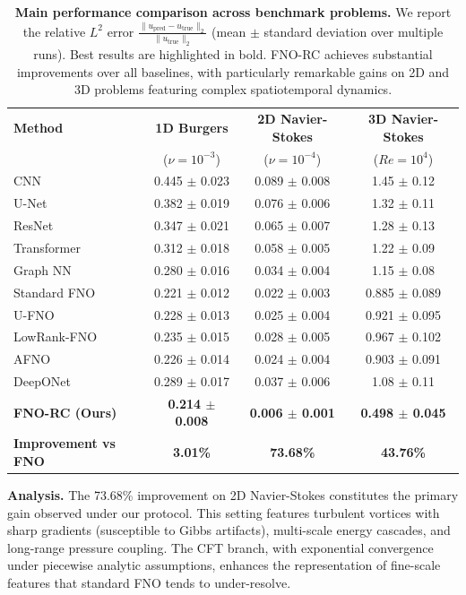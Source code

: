\documentclass[11pt]{article}
\begin{document}
\begin{table}[h]
\centering
\caption{\textbf{Main performance comparison across benchmark problems.} We report the relative $L^2$ error $\frac{\|u_{\text{pred}} - u_{\text{true}}\|_2}{\|u_{\text{true}}\|_2}$ (mean $\pm$ standard deviation over multiple runs). Best results are highlighted in bold. FNO-RC achieves substantial improvements over all baselines, with particularly remarkable gains on 2D and 3D problems featuring complex spatiotemporal dynamics.}
\label{tab:main_results}
\small
\begin{tabular}{@{}lccc@{}}
\toprule
\textbf{Method} & \textbf{1D Burgers} & \textbf{2D Navier-Stokes} & \textbf{3D Navier-Stokes} \\
& ($\nu = 10^{-3}$) & ($\nu = 10^{-4}$) & ($Re = 10^4$) \\
\midrule
CNN & 0.445 $\pm$ 0.023 & 0.089 $\pm$ 0.008 & 1.45 $\pm$ 0.12 \\
U-Net & 0.382 $\pm$ 0.019 & 0.076 $\pm$ 0.006 & 1.32 $\pm$ 0.11 \\
ResNet & 0.347 $\pm$ 0.021 & 0.065 $\pm$ 0.007 & 1.28 $\pm$ 0.13 \\
Transformer & 0.312 $\pm$ 0.018 & 0.058 $\pm$ 0.005 & 1.22 $\pm$ 0.09 \\
Graph NN & 0.280 $\pm$ 0.016 & 0.034 $\pm$ 0.004 & 1.15 $\pm$ 0.08 \\
\midrule
Standard FNO & 0.221 $\pm$ 0.012 & 0.022 $\pm$ 0.003 & 0.885 $\pm$ 0.089 \\
U-FNO & 0.228 $\pm$ 0.013 & 0.025 $\pm$ 0.004 & 0.921 $\pm$ 0.095 \\
LowRank-FNO & 0.235 $\pm$ 0.015 & 0.028 $\pm$ 0.005 & 0.967 $\pm$ 0.102 \\
AFNO & 0.226 $\pm$ 0.014 & 0.024 $\pm$ 0.004 & 0.903 $\pm$ 0.091 \\
DeepONet & 0.289 $\pm$ 0.017 & 0.037 $\pm$ 0.006 & 1.08 $\pm$ 0.11 \\
\midrule
\textbf{FNO-RC (Ours)} & \textbf{0.214 $\pm$ 0.008} & \textbf{0.006 $\pm$ 0.001} & \textbf{0.498 $\pm$ 0.045} \\
\midrule
\textbf{Improvement vs FNO} & \textbf{3.01\%} & \textbf{73.68\%} & \textbf{43.76\%} \\
\bottomrule
\end{tabular}
\end{table}

\textbf{Analysis.} The 73.68\% improvement on 2D Navier-Stokes constitutes the primary gain observed under our protocol. This setting features turbulent vortices with sharp gradients (susceptible to Gibbs artifacts), multi-scale energy cascades, and long-range pressure coupling. The CFT branch, with exponential convergence under piecewise analytic assumptions, enhances the representation of fine-scale features that standard FNO tends to under-resolve.
\end{document}
